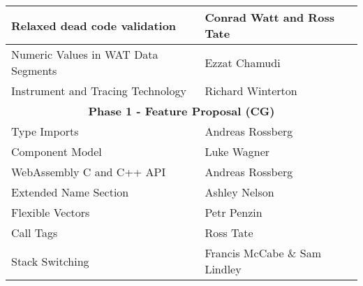 \begin{table}[htbp]
\begin{tabular}{|ll|}
    \multicolumn{1}{|l|}{Relaxed dead code validation}                   & Conrad Watt and Ross Tate                                                                                                       \\ \hline
    \multicolumn{1}{|l|}{Numeric Values in WAT Data Segments}            & Ezzat Chamudi                                                                                                                   \\ \hline
    \multicolumn{1}{|l|}{Instrument and Tracing Technology}              & Richard Winterton                                                                                                               \\ \hline
    \multicolumn{2}{|c|}{\textbf{Phase 1 - Feature Proposal (CG)}}                                                                                                                                         \\ \hline
    \multicolumn{1}{|l|}{Type Imports}                                   & Andreas Rossberg                                                                                                                \\ \hline
    \multicolumn{1}{|l|}{Component Model}                                & Luke Wagner                                                                                                                     \\ \hline
    \multicolumn{1}{|l|}{WebAssembly C and C++ API}                      & Andreas Rossberg                                                                                                                \\ \hline
    \multicolumn{1}{|l|}{Extended Name Section}                          & Ashley Nelson                                                                                                                   \\ \hline
    \multicolumn{1}{|l|}{Flexible Vectors}                               & Petr Penzin                                                                                                                     \\ \hline
    \multicolumn{1}{|l|}{Call Tags}                                      & Ross Tate                                                                                                                       \\ \hline
    \multicolumn{1}{|l|}{Stack Switching}                                & Francis McCabe \& Sam Lindley                                                                                                   \\ \hline

\end{tabular}
\end{table}
